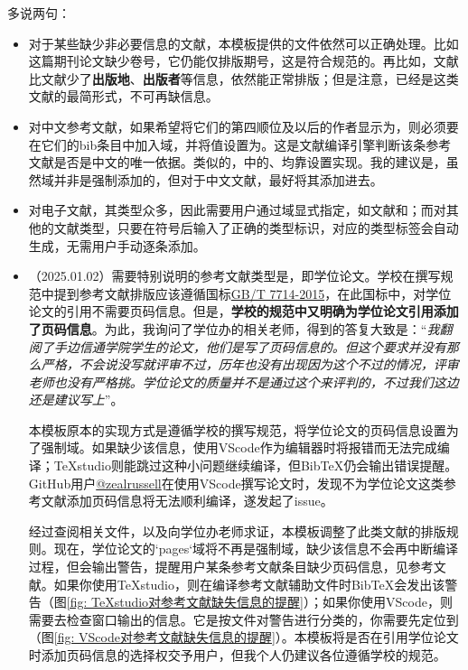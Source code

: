 \documentclass[print, doctor, vlined]{DissertUESTC}
\begin{document}
	多说两句：
	\begin{itemize}
		\item 对于某些缺少非必要信息的文献，本模板提供的文件依然可以正确处理。比如\cite{王晓琰2019关于连续出版会议论文著录格式的探讨}这篇期刊论文缺少卷号，它仍能仅排版期号，这是符合规范的。再比如，文献\cite{电子文献2}比文献\cite{电子文献1}少了\textbf{出版地}、\textbf{出版者}等信息，依然能正常排版；但是注意，\cite{电子文献2}已经是这类文献的最简形式，不可再缺信息。
		
		\item 对中文参考文献，如果希望将它们的第四顺位及以后的作者显示为，则必须要在它们的bib条目中加入域，并将值设置为。这是文献编译引擎判断该条参考文献是否是中文的唯一依据。类似的，\cite{罗杰斯2011}中的、均靠设置实现。我的建议是，虽然域并非是强制添加的，但对于中文文献，最好将其添加进去。
		
		\item 对电子文献，其类型众多，因此需要用户通过域显式指定，如文献\cite{电子文献1}和\cite{电子文献2}；而对其他的文献类型，只要在符号后输入了正确的类型标识，对应的类型标签会自动生成，无需用户手动逐条添加。
		
		\item （2025.01.02）需要特别说明的参考文献类型是，即学位论文。学校在撰写规范中提到参考文献排版应该遵循国标\href{https://lib.tsinghua.edu.cn/wj/GBT7714-2015.pdf}{\color{DarkRed}GB/T 7714-2015}，在此国标中，对学位论文的引用不需要页码信息。但是，\textbf{学校的规范中又明确为学位论文引用添加了页码信息}。为此，我询问了学位办的相关老师，得到的答复大致是：“\textit{我翻阅了手边信通学院学生的论文，他们是写了页码信息的。但这个要求并没有那么严格，不会说没写就评审不过，历年也没有出现因为这个不过的情况，评审老师也没有严格挑。学位论文的质量并不是通过这个来评判的，不过我们这边还是建议写上}”。
   
		本模板原本的实现方式是遵循学校的撰写规范，将学位论文的页码信息设置为了强制域。如果缺少该信息，使用VScode作为编辑器时将报错而无法完成编译；TeXstudio则能跳过这种小问题继续编译，但BibTeX仍会输出错误提醒。GitHub用户\href{https://github.com/zealrussell}{\color{DarkRed}@zealrussell}在使用VScode撰写论文时，发现不为学位论文这类参考文献添加页码信息将无法顺利编译，遂发起了issue。
		
		经过查阅相关文件，以及向学位办老师求证，本模板调整了此类文献的排版规则。现在，学位论文的`pages`域将不再是强制域，缺少该信息不会再中断编译过程，但会输出警告，提醒用户某条参考文献条目缺少页码信息，见参考文献\cite{陈念永2001毫米波细胞生物效应及抗肿瘤研究无页码}。如果你使用TeXstudio，则在编译参考文献辅助文件时BibTeX会发出该警告（图\ref{fig: TeXstudio对参考文献缺失信息的提醒}）；如果你使用VScode，则需要去检查窗口输出的信息。它是按文件对警告进行分类的，你需要先定位到（图\ref{fig: VScode对参考文献缺失信息的提醒}）。本模板将是否在引用学位论文时添加页码信息的选择权交予用户，但我个人仍建议各位遵循学校的规范。
	\end{itemize}
	
\end{document}
